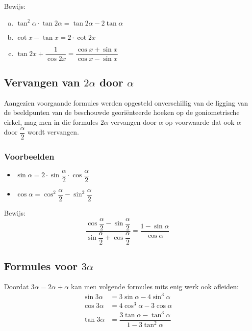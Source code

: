 \documentclass[a4paper,12pt]{article}
\begin{document}
\begin{oefening} %
Bewijs:
\begin{enumerate}[(a)]
  \itemsep.5em
  \item $\displaystyle \tan^2\alpha\cdot\tan 2\alpha=\tan 2\alpha - 2\tan\alpha$
  \item $\displaystyle \cot x - \tan x = 2\cdot\cot 2x$
  \item $\displaystyle \tan 2x + \dfrac{1}{\cos 2x} = \dfrac{\cos x + \sin x}{\cos x - \sin x}$
\end{enumerate}
\end{oefening}

\begin{theorie}

\subsection{Vervangen van $2\alpha$ door $\alpha$}

Aangezien voorgaande formules werden opgesteld onverschillig van de ligging van de
beeldpunten van de beschouwde georiënteerde hoeken op de goniometrische cirkel,
mag men in die formules $2\alpha$ vervangen door $\alpha$ op voorwaarde dat ook
$\alpha$ door $\dfrac{\alpha}{2}$ wordt vervangen.

\subsubsection*{Voorbeelden}
\begin{itemize}
  \item $\sin\alpha = 2\cdot\sin\dfrac{\alpha}{2}\cdot\cos\dfrac{\alpha}{2}$
  \item $\cos\alpha = \cos^2\dfrac{\alpha}{2}-\sin^2\dfrac{\alpha}{2}$
\end{itemize}

\end{theorie}

\begin{oefening}
Bewijs:
$$\dfrac{\cos\dfrac{\alpha}{2}-\sin\dfrac{\alpha}{2}}{\sin\dfrac{\alpha}{2}+\cos\dfrac{\alpha}{2}}=\dfrac{1-\sin\alpha}{\cos\alpha}$$
\end{oefening}

\begin{theorie}

\subsection{Formules voor $3\alpha$}

Doordat $3\alpha=2\alpha + \alpha$ kan men volgende formules mits enig werk ook afleiden:
\begin{align*}
  \sin 3\alpha &= 3\sin\alpha -4\sin^3\alpha\\
  \cos 3\alpha &= 4\cos^3\alpha -3\cos\alpha\\
  \tan 3\alpha &= \dfrac{3\tan\alpha -\tan^3\alpha}{1-3\tan^2\alpha}
\end{align*}

\end{theorie}
\end{document}
